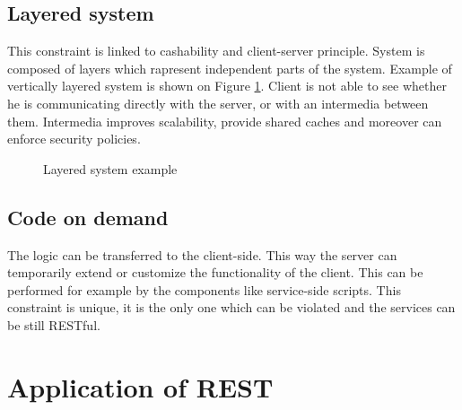 \subsection{Layered system}

This constraint is linked to cashability and client-server principle. System is composed of layers which rapresent independent parts of the system. Example of vertically layered system is shown on Figure \ref{fig:layered-system}. Client is not able to see whether he is communicating directly with the server, or with an intermedia between them. Intermedia improves scalability, provide shared caches and moreover can enforce security policies.

\begin{figure}[htp] 
\caption{Layered system example}
\label{fig:layered-system}
\end{figure} 

\subsection{Code on demand}

The logic can be transferred to the client-side. This way the server can temporarily extend or customize the functionality of the client. This can be performed for example by the components like service-side scripts.
This constraint is unique, it is the only one which can be violated and the services can be still RESTful.

\section{Application of REST}


